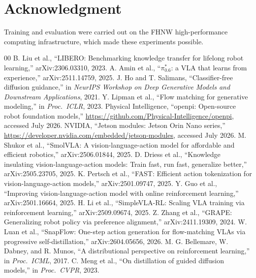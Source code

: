 \documentclass[conference]{IEEEtran}
\begin{document}
\section*{Acknowledgment}
Training and evaluation were carried out on the FHNW high-performance computing
infrastructure, which made these experiments possible.

\begin{thebibliography}{00}
 B. Liu et al., ``LIBERO: Benchmarking knowledge transfer for lifelong
robot learning,'' arXiv:2306.03310, 2023.
 A. Amin et al., ``$\pi^{*}_{0.6}$: a VLA that
learns from experience,'' arXiv:2511.14759, 2025.
 J. Ho and T. Salimans, ``Classifier-free diffusion guidance,'' in
\emph{NeurIPS Workshop on Deep Generative Models and Downstream Applications}, 2021.
 Y. Lipman et al., ``Flow matching
for generative modeling,'' in \emph{Proc.\ ICLR}, 2023.
 Physical Intelligence, ``openpi: Open-source robot foundation models,''
\url{https://github.com/Physical-Intelligence/openpi}, accessed July 2026.
 NVIDIA, ``Jetson modules: Jetson Orin Nano series,''
\url{https://developer.nvidia.com/embedded/jetson-modules}, accessed July 2026.
 M. Shukor et al., ``SmolVLA: A vision-language-action model for
affordable and efficient robotics,'' arXiv:2506.01844, 2025.
 D. Driess et al., ``Knowledge insulating vision-language-action models: Train
fast, run fast, generalize better,'' arXiv:2505.23705, 2025.
 K. Pertsch et al., ``FAST: Efficient action tokenization for
vision-language-action models,'' arXiv:2501.09747, 2025.
 Y. Guo et al., ``Improving vision-language-action model with online
reinforcement learning,'' arXiv:2501.16664, 2025.
 H. Li et al., ``SimpleVLA-RL: Scaling VLA training via reinforcement
learning,'' arXiv:2509.09674, 2025.
 Z. Zhang et al., ``GRAPE: Generalizing robot policy via preference
alignment,'' arXiv:2411.19309, 2024.
 W. Luan et al., ``SnapFlow:
One-step action generation for flow-matching VLAs via progressive self-distillation,''
arXiv:2604.05656, 2026.
 M. G. Bellemare, W. Dabney, and R. Munos, ``A distributional perspective on
reinforcement learning,'' in \emph{Proc.\ ICML}, 2017.
 C. Meng et al., ``On distillation of guided diffusion models,'' in
\emph{Proc.\ CVPR}, 2023.
\end{thebibliography}
\end{document}
